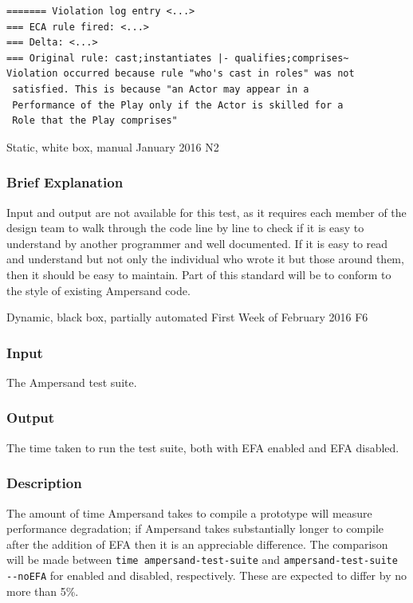 \documentclass[12pt]{report}
\begin{document}
\begin{verbatim}
======= Violation log entry <...>
=== ECA rule fired: <...> 
=== Delta: <...>
=== Original rule: cast;instantiates |- qualifies;comprises~
Violation occurred because rule "who's cast in roles" was not 
 satisfied. This is because "an Actor may appear in a 
 Performance of the Play only if the Actor is skilled for a 
 Role that the Play comprises"
\end{verbatim}


{Static, white box, manual}
{January 2016}
{N2}
\vspace{-12pt}\subsubsection*{Brief Explanation}
Input and output are not available for this test, as it requires each member of
the design team to walk through the code line by line to check if it is easy to
understand by another programmer and well documented. If it is easy to read and
understand but not only the individual who wrote it but those around them, then
it should be easy to maintain. Part of this standard will be to conform to the
style of existing Ampersand code.


{Dynamic, black box, partially automated}
{First Week of February 2016 }
{F6}
\vspace{-12pt}\subsubsection*{Input}
The Ampersand test suite. 

\vspace{-12pt}\subsubsection*{Output}
The time taken to run the test suite, both with EFA enabled and EFA disabled.

\vspace{-12pt}\subsubsection*{Description}
The amount of time Ampersand takes to compile a prototype will measure
performance degradation; if Ampersand takes substantially longer to compile
after the addition of EFA then it is an appreciable difference.  The comparison
will be made between \verb|time ampersand-test-suite| and
\verb|ampersand-test-suite --noEFA| for enabled and disabled,
respectively. These are expected to differ by no more than 5\%. 
\end{document}
